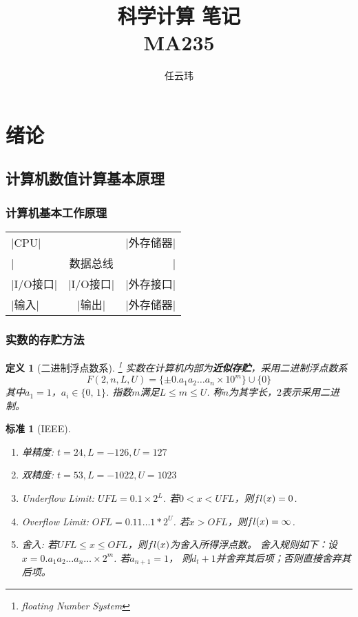 \documentclass[12pt, a4paper]{article}
\title{科学计算 笔记\\MA235}
\author{任云玮}
\date{}
\theoremstyle{margin}
\newtheorem{defi}[thm]{定义}
\newtheorem{std}[thm]{标准}
\newcommand{\tbf}{\textbf}
\newcommand{\fl}{\mathnormal{fl}}
\newcommand{\aoneton}{a_1a_2\dots a_n}
\begin{document}
\maketitle
\tableofcontents
\newpage

\section{绪论}

\subsection{计算机数值计算基本原理}

\subsubsection{计算机基本工作原理}
  \begin{tabular}{lcr}
    |CPU| &  & |外存储器| \\
    | & 数据总线 & | \\
    |I/O接口| & |I/O接口| & |外存接口| \\
    |输入|    & |输出|    & |外存储器|
  \end{tabular}

\subsubsection{实数的存贮方法}
  \begin{defi}[二进制浮点数系]\footnote{floating Number System}
    实数在计算机内部为\tbf{近似存贮}，采用二进制浮点数系
    \[
      F(2,n,L,U)=\{\pm0.\aoneton\times10^m\}\cup\{0\}
    \]
    其中$a_1=1$，$a_i\in\{0,\,1\}$. 指数$m$满足$L\le m\le U$.
    称$n$为其字长，$2$表示采用二进制。
  \end{defi}

  \begin{std}[IEEE]
    $\,$
    \begin{enumerate}
      \item 单精度: $t=24,L=-126,U=127$
      \item 双精度: $t=53,L=-1022,U=1023$
      \item Underflow Limit: $UFL=0.1\times2^L$.
      若$0<x<UFL$，则$\\fl(x)=0$.
      \item Overflow Limit: $OFL=0.11\dots1*2^U$.
      若$x>OFL$，则$\fl(x)=\infty$.
      \item 舍入: 若$UFL\le x\le OFL$，则$\fl(x)$为舍入所得浮点数。
      舍入规则如下：设$x=0.\aoneton\dots\times2^m$. 若$a_{n+1}=1$，
      则$d_t+1$并舍弃其后项；否则直接舍弃其后项。
    \end{enumerate}
  \end{std}
\end{document}
